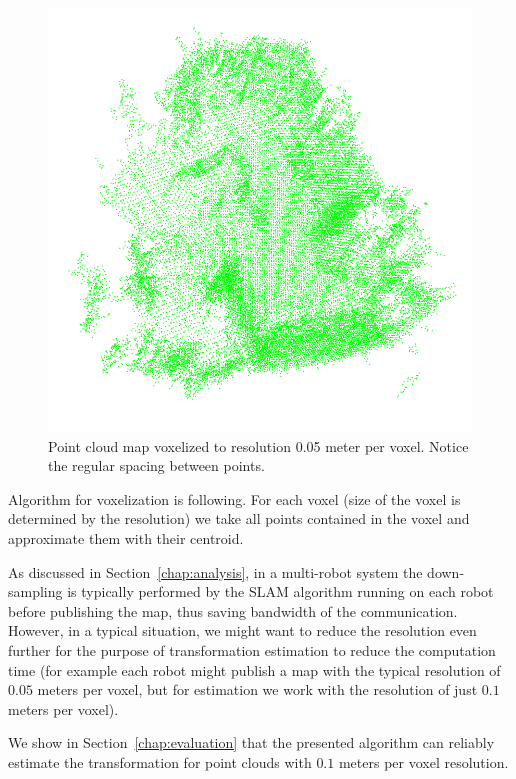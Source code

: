 \begin{figure}
    \centering
    \includegraphics[width=\textwidth]{../img/v1-downsampled.png}
    \caption[A voxelized point cloud map]{Point cloud map voxelized to resolution 0.05 meter per voxel. Notice the regular spacing between points.}
    \label{fig:v1-downsampled}
\end{figure}

Algorithm for voxelization is following. For each voxel (size of the voxel is determined by the resolution) we take all points contained in the voxel and approximate them with their centroid.

As discussed in Section~\ref{chap:analysis}, in a multi-robot system the down-sampling is typically performed by the \gls{SLAM} algorithm running on each robot before publishing the map, thus saving bandwidth of the communication. However, in a typical situation, we might want to reduce the resolution even further for the purpose of transformation estimation to reduce the computation time (for example each robot might publish a map with the typical resolution of $0.05$ meters per voxel, but for estimation we work with the resolution of just $0.1$ meters per voxel).

We show in Section~\ref{chap:evaluation} that the presented algorithm can reliably estimate the transformation for point clouds with $0.1$ meters per voxel resolution.

